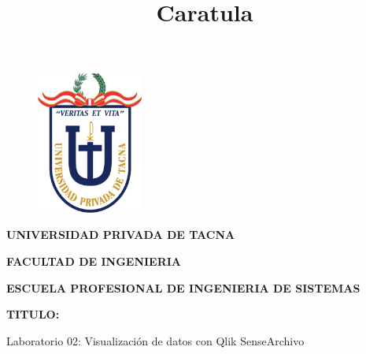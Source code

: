 \documentclass[12pt,letterpaper]{article}
\begin{document}
%


\title{Caratula}

\begin{titlepage}
\begin{center}
\begin{figure}[htb]
\begin{center}
\includegraphics[width=3.5cm]{./img/logo}
\end{center}
\end{figure}

\vspace*{0.15in}
\begin{Large}
\textbf{UNIVERSIDAD PRIVADA DE TACNA}\\
\end{Large}

\vspace*{0.1in}
\begin{Large}
\textbf{FACULTAD DE INGENIERIA} \\
\end{Large}

\vspace*{0.1in}
\begin{Large}
\textbf{ESCUELA PROFESIONAL DE INGENIERIA DE SISTEMAS} \\
\end{Large}

\vspace*{0.5in}
\begin{Large}
\textbf{TITULO:}\\
\end{Large}

\vspace*{0.1in}
\begin{Large}
    Laboratorio 02: Visualización de datos con Qlik SenseArchivo\\
\end{Large}


\end{center}
\end{titlepage}
\end{document}
